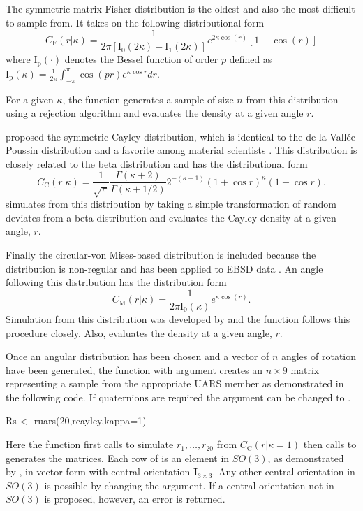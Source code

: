 The symmetric matrix Fisher distribution is the oldest and also the most difficult to sample from.  It takes on the following distributional form
\[
C_\mathrm{{F}}(r| 
\kappa)=\frac{1}{2\pi[\mathrm{I_0}(2\kappa)-\mathrm{I_1}(2\kappa)]}e^{2\kappa\cos(r)}[1-\cos(r)]
\]
where $\mathrm{I_p}(\cdot)$ denotes the Bessel function of order $p$ defined as  $\mathrm{I_p}(\kappa)=\frac{1}{2\pi}\int_{-\pi}^{\pi}\cos(pr)e^{\kappa\cos r}dr$.  

For a given $\kappa$, the function  generates a sample of size $n$ from this distribution using a rejection algorithm and  evaluates the density at a given angle $r$.

\citet{leon2006} proposed the symmetric Cayley distribution, which is identical to the de la Vall\'{e}e Poussin distribution and a favorite among material scientists \citep{Schaeben1997}.  This distribution is closely related to the beta distribution and has the distributional form
\[
C_\mathrm{C}(r |\kappa)=\frac{1}{\sqrt{\pi}} \frac{\Gamma(\kappa+2)}{\Gamma(\kappa+1/2)}2^{-(\kappa+1)}(1+\cos r)^\kappa(1-\cos r).
\]
 simulates from this distribution by taking a simple transformation of random deviates from a beta distribution and  evaluates the Cayley density at a given angle, $r$.

Finally the circular-von Mises-based distribution is included because the distribution is non-regular and has been applied to EBSD data \citep{bingham2009}.  An angle following this distribution has the distribution form
\[
C_\mathrm{M}(r|\kappa)=\frac{1}{2\pi \mathrm{I_0}(\kappa)}e^{\kappa\cos(r)}.
\]
Simulation from this distribution was developed by \citet{best1979} and the function  follows this procedure closely.  Also,  evaluates the density at a given angle, $r$.

Once an angular distribution has been chosen and a vector of $n$ angles of rotation have been generated, the  function with argument  creates an $n\times 9$ matrix representing a sample from the appropriate UARS member as demonstrated in the following code.  If quaternions are required the argument  can be changed to .

\begin{example}
Rs <- ruars(20,rcayley,kappa=1)
\end{example}

Here the  function first calls  to simulate $r_1,\ldots,r_{20}$ from  $C_\mathrm{C}(r |\kappa=1)$ then calls  to generates the matrices.  Each row of  is an element in $SO(3)$, as demonstrated by , in vector form with central orientation $\bm I_{3\times 3}$.  Any other central orientation in $SO(3)$ is possible by changing the  argument.  If a central orientation not in $SO(3)$ is proposed, however, an error is returned.

